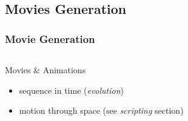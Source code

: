 \subsection{Movies Generation}

\begin{frame}
\frametitle{Movie Generation}

\begin{columns}
\begin{column}{5cm}
	\begin{block}{Movies \& Animations}
	\begin{itemize}
	\item[\ding{224}] sequence in time (\textit{evolution})
	\item[\ding{224}] motion through space (see \textit{scripting} section)
	\end{itemize}
	\end{block}
\end{column}
\begin{column}{5cm}
\end{column}
\end{columns}
\end{frame}

